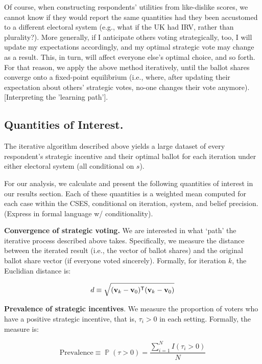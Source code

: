 \documentclass[12pt, letter]{article}
\DeclareMathOperator{\Prob}{\mathbb{P}}
\newcommand*{\trans}{^{\mathsf{T}}} %
\begin{document}
Of course, when constructing respondents' utilities from like-dislike scores, we cannot know if they would report the same quantities had they been accustomed to a different electoral system (e.g., what if the UK had IRV, rather than plurality?). More generally, if I anticipate others voting strategically, too, I will update my expectations accordingly, and my optimal strategic vote may change as a result. This, in turn, will affect everyone else's optimal choice, and so forth. For that reason, we apply the above method iteratively, until the ballot shares converge onto a fixed-point equilibrium (i.e., where, after updating their expectation about others' strategic votes, no-one changes their vote anymore). [Interpreting the 'learning path'].

\subsection{Quantities of Interest.}

The iterative algorithm described above yields a large dataset of every respondent's strategic incentive and their optimal ballot for each iteration under either electoral system (all conditional on $s$).

For our analysis, we calculate and present the following quantities of interest in our results section. Each of these quantities is a weighted mean computed for each case within the CSES, conditional on iteration, system, and belief precision. (Express in formal language w/ conditionality).

\textbf{Convergence of strategic voting.} We are interested in what `path' the iterative process described above takes. Specifically, we measure the distance between the iterated result (i.e., the vector of ballot shares) and the original ballot share vector (if everyone voted sincerely). Formally, for iteration $k$, the Euclidian distance is:

\begin{equation}
	d \equiv \sqrt{({\bf v}_k - {\bf v}_0)\trans ({\bf v}_k - {\bf v}_0)}
\end{equation}

\textbf{Prevalence of strategic incentives}. We measure the proportion of voters who have a positive strategic incentive, that is, $\tau_i > 0$ in each setting. Formally, the measure is:

\begin{equation}
	\text{Prevalence} \equiv \Prob(\tau > 0) = \frac{\sum^N_{i = 1} I(\tau_i > 0)}{N}
\end{equation}
\end{document}
